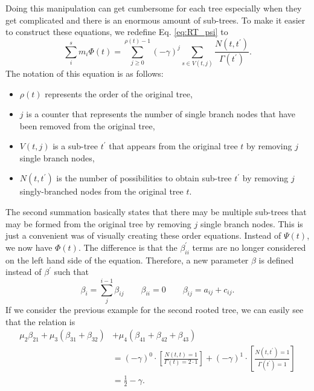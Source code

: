 \documentclass{ansconf}
\numberwithin{equation}{section}
\begin{document}
Doing this manipulation can get cumbersome for each tree especially when they get complicated and there is an enormous amount of sub-trees. To make it easier to construct these equations, we redefine Eq. \eqref{eq:RT_psi} to
\begin{equation} \label{eq:RT_eq}
    \sum_i^s m_i \Phi\left(t\right) = \sum_{j\ge 0}^{\rho\left(t\right)-1} \left(-\gamma\right)^j \sum_{s \in V\left(t,j\right)} \frac{N\left(t,t^\prime\right)}{\Gamma\left(t^\prime\right)}.
\end{equation}
The notation of this equation is as follows:
\begin{itemize}
    \item $\rho\left(t\right)$ represents the order of the original tree,
    \item $j$ is a counter that represents the number of single branch nodes that have been removed from the original tree,
    \item $V\left(t,j\right)$ is a sub-tree $t^\prime$ that appears from the original tree $t$ by removing $j$ single branch nodes,
    \item $N\left(t,t^\prime\right)$ is the number of possibilities to obtain sub-tree $t^\prime$ by removing $j$ singly-branched nodes from the original tree $t$.
\end{itemize}
The second summation basically states that there may be multiple sub-trees that may be formed from the original tree by removing $j$ single branch nodes. This is just a convenient was of visually creating these order equations. Instead of $\Psi\left(t\right)$, we now have $\Phi\left(t\right)$.  The difference is that the $\beta^\prime_{ii}$ terms are no longer considered on the left hand side of the equation. Therefore, a new parameter $\beta$ is defined instead of $\beta^\prime$ such that
\begin{equation}\label{eq:simp2}
    \beta_i = \sum_j^{i-1} \beta_{ij} \qquad \beta_{ii} = 0 \qquad \beta_{ij} = a_{ij} + c_{ij}.
\end{equation}
If we consider the previous example for the second rooted tree, we can easily see that the relation is
\begin{align}
    \mu_2\beta_{21} + \mu_3\left(\beta_{31} + \beta_{32} \right) & + \mu_4\left(\beta_{41} + \beta_{42}+ \beta_{43} \right) \\ \nonumber & = \left(-\gamma\right)^0\cdot\left[\frac{N\left(t,t\right) = 1}{\Gamma\left(t\right) = 2\cdot 1}\right] + \left(-\gamma\right)^1\cdot\left[\frac{N\left(t,t^\prime\right) = 1}{\Gamma\left(t^\prime\right) = 1}\right]\\ \nonumber  & = \frac{1}{2} - \gamma .
\end{align}
\end{document}
